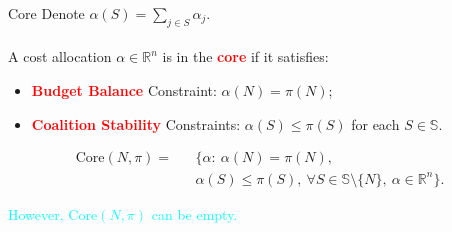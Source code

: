 \documentclass[14pt]{beamer}
\newcommand{\R}{\mathbb{R}}
\begin{document}
\begin{frame}{Core}
\small
Denote $\alpha(S)=\sum_{j \in S}\alpha_j$. \\~\\
A cost allocation $\alpha \in \R^n$ is in the \textcolor{red}{\bf core} if it satisfies:
\begin{itemize}
\small
\justifying
	\item \textcolor{red}{\bf Budget Balance} Constraint: $\alpha(N)=\pi(N)$;
	\item \textcolor{red}{\bf Coalition Stability} Constraints: $\alpha(S)\leq \pi(S)$ for each  $S\in \mathbb{S}$.
\end{itemize}
\vspace{-12pt}
\begin{eqnarray*}
\mathrm{Core}(N,\pi) = &&\bigg\{ \alpha:~ \alpha(N)=\pi(N), \\
&& \alpha(S) \leq \pi(S), ~\forall S \in \mathbb{S} \setminus \{N\},~\alpha \in \R^n   \bigg\}.
\end{eqnarray*}

\pause
\vspace{-12pt}
\textcolor{cyan}{However, $\mathrm{Core}(N,\pi)$ can be empty.}
\end{frame}
\end{document}
